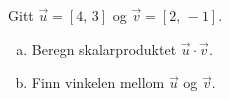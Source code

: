%
Gitt $\vec{u} = [4,\,3]$ og $\vec{v} = [2,\,-1]$.
\begin{enumerate}[a)]
    \item Beregn skalarproduktet $\vec{u} \cdot \vec{v}$.
    \item Finn vinkelen mellom $\vec{u}$ og $\vec{v}$.
\end{enumerate}
